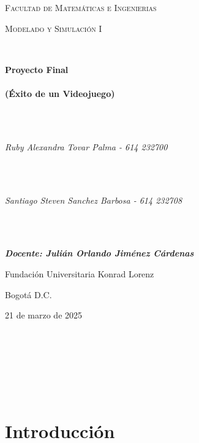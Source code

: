 \documentclass[titlepage,a4paper]{article}
\newcommand{\titulo}{Proyecto Final \\\\ 

(Éxito de un Videojuego)
}
\newcommand{\facultad}{Matemáticas e Ingenierias}
\newcommand{\autora}{    
\\ Ruby Alexandra Tovar Palma - 614 232700


}
\newcommand{\autor}{
\\ Santiago Steven Sanchez Barbosa - 614 232708
}
\newcommand{\docente}{
\\ \textbf{Docente:  Julián Orlando Jiménez Cárdenas} 
}
\newcommand{\materia}{Modelado y Simulación I}
\newcommand{\ciudad}{Bogotá D.C.}
\newcommand{\universidad}{Fundación Universitaria Konrad Lorenz}
\newcommand{\fecha}{21 de marzo de 2025}
\begin{document}
	
	
	\begin{titlepage}
		
		\centering	
		
		{\scshape\LARGE Facultad de \facultad\par}
		
		\vspace{1cm}
		
		{\scshape\Large \materia\par}
		
		\vspace{1.5cm}                            
		
		{\huge\bfseries \titulo\par}
		
		\vspace{3cm}                            
		
		{\Large\itshape \autora}
  
		\vspace{0.5cm}                            

  	{\Large\itshape \autor}
  
		\vspace{3cm}                            

  	{\Large\itshape \docente}
		
		\vfill

        {\Large \universidad\par}   %
        {\large \ciudad\par}
        {\large \fecha}
		
	\end{titlepage}    

\vspace*{3cm}
\Large{\textbf{}}\\
\vspace{2cm}    
\normalsize
\tableofcontents
\newpage


\\
\section{Introducción}
\end{document}
